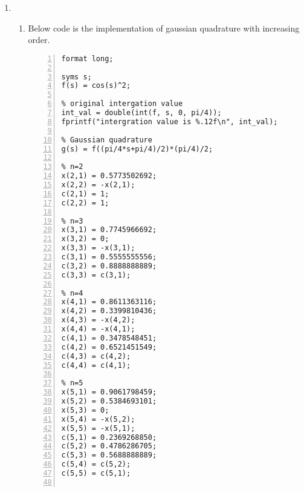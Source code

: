 \documentclass{article}
\begin{document}
\begin{enumerate}
\begin{lstlisting}[frame=single, numbers=left, style=Matlab-editor]
    % Step 4
    i = i - 1;  % Delete the level

    % Step 5
    if abs(S1+S2-v7) < v6
        approx_int_val = approx_int_val + S1 + S2;
    else
        if v8 >= N  % level exceeds
            fprintf("LEVEL EXCEEDED");  % procedure fails
            return;
        else    % add one level
            % data for right-half subinterval
            i = i + 1;
            a(i) = v1 + v5;
            FA(i) = v3;
            FC(i) = FE;
            FB(i) = v4;
            h(i) = v5/2;
            TOLs(i) = v6/2;
            S(i) = S2;
            L(i) = v8 + 1;
            % data for left-half subinterval
            i = i + 1;
            a(i) = v1;
            FA(i) = v2;
            FC(i) = FD;
            FB(i) = v3;
            h(i) = h(i-1);
            TOLs(i) = TOLs(i-1);
            S(i) = S1;
            L(i) = L(i-1);
        end
    end
end

approx_int_val = double(approx_int_val);
fprintf("approximated value is %.4f\n", approx_int_val);
    \end{lstlisting} If we run this code, we get the below result: \begin{lstlisting}[frame=single, numbers=left, style=Matlab-editor]
intergration value is 0.2667
approximated value is 0.2667
    \end{lstlisting}
    \item \begin{enumerate}[wide=10pt]
        \item Below code is the implementation of gaussian quadrature with increasing order. \begin{lstlisting}[frame=single, numbers=left, style=Matlab-editor]
format long;

syms s;
f(s) = cos(s)^2;

% original intergation value
int_val = double(int(f, s, 0, pi/4));
fprintf("intergration value is %.12f\n", int_val);

% Gaussian quadrature
g(s) = f((pi/4*s+pi/4)/2)*(pi/4)/2;

% n=2
x(2,1) = 0.5773502692;
x(2,2) = -x(2,1);
c(2,1) = 1;
c(2,2) = 1;

% n=3
x(3,1) = 0.7745966692;
x(3,2) = 0;
x(3,3) = -x(3,1);
c(3,1) = 0.5555555556;
c(3,2) = 0.8888888889;
c(3,3) = c(3,1);

% n=4
x(4,1) = 0.8611363116;
x(4,2) = 0.3399810436;
x(4,3) = -x(4,2);
x(4,4) = -x(4,1);
c(4,1) = 0.3478548451;
c(4,2) = 0.6521451549;
c(4,3) = c(4,2);
c(4,4) = c(4,1);

% n=5
x(5,1) = 0.9061798459;
x(5,2) = 0.5384693101;
x(5,3) = 0;
x(5,4) = -x(5,2);
x(5,5) = -x(5,1);
c(5,1) = 0.2369268850;
c(5,2) = 0.4786286705;
c(5,3) = 0.5688888889;
c(5,4) = c(5,2);
c(5,5) = c(5,1);


\end{lstlisting}
\end{enumerate}
\end{enumerate}
\end{document}
